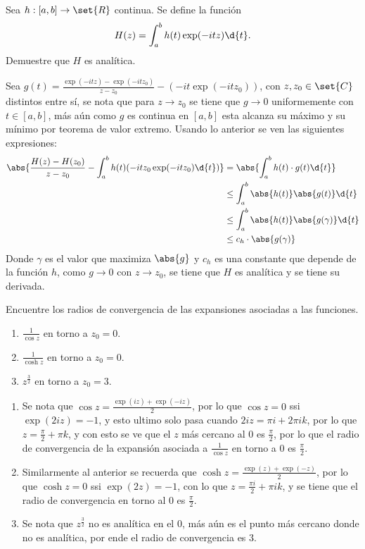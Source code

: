 \documentclass{homework}
\begin{document}
\begin{prob}
    Sea \(h:[a,b]\rightarrow\set{R}\) continua. Se define la función
    \[H(z)=\int_a^bh(t)\exp(-itz)\d{t}.\]
    Demuestre que \(H\) es analítica.
\end{prob}

\begin{sol}
    Sea \(g(t)=\frac{\exp(-itz)-\exp(-itz_0)}{z-z_0}-(-it\exp(-itz_0))\), con \(z,z_0\in\set{C}\) distintos entre sí, se nota que para \(z\rightarrow z_0\) se tiene que \(g\rightarrow 0\) uniformemente con \(t\in[a,b]\), más aún como \(g\) es continua en \([a,b]\) esta alcanza su máximo y su mínimo por teorema de valor extremo. Usando lo anterior se ven las siguientes expresiones:
    \begin{align*}
        \abs{\frac{H(z)-H(z_0)}{z-z_0}-\int_a^bh(t)(-itz_0\exp(-itz_0)\d{t})}&=\abs{\int_a^bh(t)\cdot g(t)\d{t}}\\
        &\leq\int_a^b\abs{h(t)}\abs{g(t)}\d{t}\\
        &\leq\int_a^b\abs{h(t)}\abs{g(\gamma)}\d{t}\\
        &\leq c_h\cdot\abs{g(\gamma)}
    \end{align*}
    Donde \(\gamma\) es el valor que maximiza \(\abs{g}\) y \(c_h\) es una constante que depende de la función \(h\), como \(g\rightarrow 0\) con \(z\rightarrow z_0\), se tiene que \(H\) es analítica y se tiene su derivada.
\end{sol}

\begin{prob}
    Encuentre los radios de convergencia de las expansiones asociadas a las funciones.
    \begin{enumerate}
        \item \(\frac1{\cos z}\) en torno a \(z_0=0\).
        \item \(\frac1{\cosh z}\) en torno a \(z_0=0\).
        \item \(z^{\frac32}\) en torno a \(z_0=3\).
    \end{enumerate}
\end{prob}

\begin{sol}
    \begin{enumerate}
        \item Se nota que \(\cos z=\frac{\exp(iz)+\exp(-iz)}2\), por lo que \(\cos z=0\) ssi \(\exp(2iz)=-1\), y esto ultimo solo pasa cuando \(2iz=\pi i+2\pi i k\), por lo que \(z=\frac\pi2+\pi k\), y con esto se ve que el \(z\) más cercano al 0 es \(\frac\pi2\), por lo que el radio de convergencia de la expansión asociada a \(\frac1{\cos z}\) en torno a 0 es \(\frac\pi2\).
        \item Similarmente al anterior se recuerda que \(\cosh z=\frac{\exp(z)+\exp(-z)}2\), por lo que \(\cosh z=0\) ssi \(\exp(2z)=-1\), con lo que \(z=\frac{\pi i}2+\pi i k\), y se tiene que el radio de convergencia en torno al 0 es \(\frac\pi2\).
        \item Se nota que \(z^\frac32\) no es analítica en el 0, más aún es el punto más cercano donde no es analítica, por ende el radio de convergencia es \(3\).
    \end{enumerate}
\end{sol}
\end{document}
